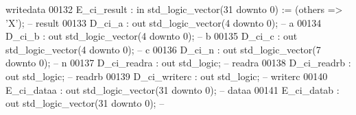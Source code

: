 \begin{DoxyCode}
{       writedata}
00132             E\_ci\_result                         : \textcolor{keywordflow}{in}  \textcolor{comment}{std\_logic\_vector}(\textcolor{vhdllogic}{}\textcolor{vhdllogic}{31} \textcolor{keywordflow}{downto} \textcolor{vhdllogic}{}\textcolor{vhdllogic}{0}) := (\textcolor{keywordflow}{others} => 'X'); \textcolor{keyword}{--
       result}
00133             D\_ci\_a                              : \textcolor{keywordflow}{out} \textcolor{comment}{std\_logic\_vector}(\textcolor{vhdllogic}{}\textcolor{vhdllogic}{4} \textcolor{keywordflow}{downto} \textcolor{vhdllogic}{}\textcolor{vhdllogic}{0});                     \textcolor{keyword}{--
       a}
00134             D\_ci\_b                              : \textcolor{keywordflow}{out} \textcolor{comment}{std\_logic\_vector}(\textcolor{vhdllogic}{}\textcolor{vhdllogic}{4} \textcolor{keywordflow}{downto} \textcolor{vhdllogic}{}\textcolor{vhdllogic}{0});                     \textcolor{keyword}{--
       b}
00135             D\_ci\_c                              : \textcolor{keywordflow}{out} \textcolor{comment}{std\_logic\_vector}(\textcolor{vhdllogic}{}\textcolor{vhdllogic}{4} \textcolor{keywordflow}{downto} \textcolor{vhdllogic}{}\textcolor{vhdllogic}{0});                     \textcolor{keyword}{--
       c}
00136             D\_ci\_n                              : \textcolor{keywordflow}{out} \textcolor{comment}{std\_logic\_vector}(\textcolor{vhdllogic}{}\textcolor{vhdllogic}{7} \textcolor{keywordflow}{downto} \textcolor{vhdllogic}{}\textcolor{vhdllogic}{0});                     \textcolor{keyword}{--
       n}
00137             D\_ci\_readra                         : \textcolor{keywordflow}{out} \textcolor{comment}{std\_logic};                                        \textcolor{keyword}{--
       readra}
00138             D\_ci\_readrb                         : \textcolor{keywordflow}{out} \textcolor{comment}{std\_logic};                                        \textcolor{keyword}{--
       readrb}
00139             D\_ci\_writerc                        : \textcolor{keywordflow}{out} \textcolor{comment}{std\_logic};                                        \textcolor{keyword}{--
       writerc}
00140             E\_ci\_dataa                          : \textcolor{keywordflow}{out} \textcolor{comment}{std\_logic\_vector}(\textcolor{vhdllogic}{}\textcolor{vhdllogic}{31} \textcolor{keywordflow}{downto} \textcolor{vhdllogic}{}\textcolor{vhdllogic}{0});                    \textcolor{keyword}{--
       dataa}
00141             E\_ci\_datab                          : \textcolor{keywordflow}{out} \textcolor{comment}{std\_logic\_vector}(\textcolor{vhdllogic}{}\textcolor{vhdllogic}{31} \textcolor{keywordflow}{downto} \textcolor{vhdllogic}{}\textcolor{vhdllogic}{0});                    \textcolor{keyword}{--
}
\end{DoxyCode}
